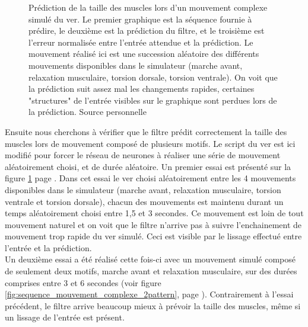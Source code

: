 \begin{figure}[ht]
   \begin{center}
   \end{center}
   \caption[Prédiction de la taille des muscles lors d'un mouvement complexe
   simulé]{Prédiction de la taille des muscles lors d'un mouvement complexe
   simulé du ver. Le premier graphique est la séquence fournie à prédire, le
   deuxième est la prédiction du filtre, et le troisième est l'erreur normalisée
   entre l'entrée attendue et la prédiction. Le mouvement réalisé ici est une
   succession aléatoire des différents mouvements disponibles dans le simulateur
   (marche avant, relaxation musculaire, torsion dorsale, torsion ventrale). On
   voit que la prédiction suit assez mal les changements rapides, certaines
   "structures" de l'entrée visibles sur le graphique sont perdues lors de la
   prédiction. Source personnelle}
   \label{fig:sequence_mouvement_complexe}
\end{figure}

Ensuite nous cherchons à vérifier que le filtre prédit correctement la taille
des muscles lors de mouvement composé de plusieurs motifs. Le script du ver est
ici modifié pour forcer le réseau de neurones à réaliser une série de mouvement
aléatoirement choisi, et de durée aléatoire. Un premier essai est présenté
sur la figure \ref{fig:sequence_mouvement_complexe} page
\pageref{fig:sequence_mouvement_complexe}.  Dans cet essai le ver choisi
aléatoirement entre les 4 mouvements disponibles dans le simulateur (marche
avant, relaxation musculaire, torsion ventrale et torsion dorsale), chacun des
mouvements est maintenu durant un temps aléatoirement choisi entre 1,5 et 3
secondes. Ce mouvement est loin de tout mouvement naturel et on voit que le
filtre n'arrive pas à suivre l'enchainement de mouvement trop rapide du ver
simulé. Ceci est visible par le lissage effectué entre l'entrée et la
prédiction.\\


Un deuxième essai a été réalisé cette fois-ci avec un mouvement simulé composé
de seulement deux motifs, marche avant et relaxation musculaire, sur des durées
comprises entre 3 et 6 secondes (voir figure
\ref{fig:sequence_mouvement_complexe_2pattern}, page
\pageref{fig:sequence_mouvement_complexe_2pattern}). Contrairement à l'essai
précédent, le filtre arrive beaucoup mieux à prévoir la taille des muscles, même
si un lissage de l'entrée est présent.

